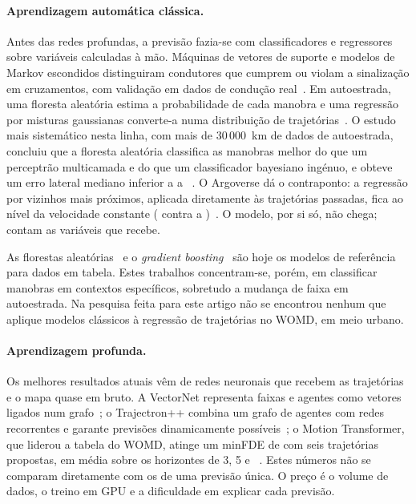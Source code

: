 \paragraph{Aprendizagem automática clássica.}
Antes das redes profundas, a previsão fazia-se com classificadores e
regressores sobre variáveis calculadas à mão. Máquinas de vetores de
suporte e modelos de Markov escondidos distinguiram condutores que cumprem
ou violam a sinalização em cruzamentos, com validação em dados de condução
real~\cite{aoude2012driver}. Em autoestrada, uma floresta aleatória
estima a probabilidade de cada manobra e uma regressão por misturas
gaussianas converte-a numa distribuição de
trajetórias~\cite{schlechtriemen2015when}. O estudo mais sistemático
nesta linha, com mais de 30\,000~km de dados de autoestrada, concluiu que
a floresta aleatória classifica as manobras melhor do que um perceptrão
multicamada e do que um classificador bayesiano ingénuo, e obteve um erro
lateral mediano inferior a  a
~\cite{wirthmuller2021teaching}. O Argoverse dá o contraponto:
a regressão por vizinhos mais próximos, aplicada diretamente às
trajetórias passadas, fica ao nível da velocidade constante
( contra  a
)~\cite{chang2019argoverse}. O modelo, por si só, não chega; contam
as variáveis que recebe.

As florestas aleatórias~\cite{breiman2001random} e o \emph{gradient
boosting}~\cite{friedman2001greedy} são hoje os modelos de referência
para dados em tabela. Estes trabalhos concentram-se, porém, em classificar
manobras em contextos específicos, sobretudo a mudança de faixa em
autoestrada. Na pesquisa feita para este artigo não se encontrou nenhum
que aplique modelos clássicos à regressão de trajetórias no WOMD, em meio
urbano.

\paragraph{Aprendizagem profunda.}
Os melhores resultados atuais vêm de redes neuronais que recebem as
trajetórias e o mapa quase em bruto. A VectorNet representa faixas e
agentes como vetores ligados num grafo~\cite{gao2020vectornet}; o
Trajectron++ combina um grafo de agentes com redes recorrentes e garante
previsões dinamicamente possíveis~\cite{salzmann2020trajectron}; o Motion
Transformer, que liderou a tabela do WOMD, atinge um minFDE de
 com seis trajetórias propostas, em média sobre os horizontes
de 3, 5 e ~\cite{shi2022motion}. Estes números não se comparam
diretamente com os de uma previsão única. O preço é o volume de dados, o
treino em GPU e a dificuldade em explicar cada previsão.

